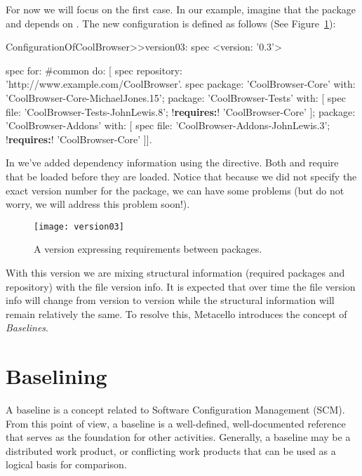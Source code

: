 \documentclass[a4paper,10pt,twoside]{book}
\begin{document}
For now we will focus on the first case. In our example, imagine that the package  and  depends on . The new configuration  is defined as follows (See Figure~\ref{fig:version03}):

\begin{code}{}
ConfigurationOfCoolBrowser>>version03: spec 
	<version: '0.3'>
	
	spec for: #common do: [
		spec repository: 'http://www.example.com/CoolBrowser'.
		spec 
			package: 'CoolBrowser-Core' with: 'CoolBrowser-Core-MichaelJones.15';
			package: 'CoolBrowser-Tests' with: [
				spec 
					file: 'CoolBrowser-Tests-JohnLewis.8';
					!\textbf{requires:}! 'CoolBrowser-Core' ];
			package: 'CoolBrowser-Addons' with: [
				spec 
					file: 'CoolBrowser-Addons-JohnLewis.3';
					!\textbf{requires:}! 'CoolBrowser-Core' ]].
\end{code}

In  we've added dependency information using the  directive.
Both  and   require that  be loaded before they are loaded. Notice that because we did not specify the exact version number for the  package, we can have some problems (but do not worry, we will address this problem soon!).

\begin{figure}
\begin{center}
\texttt{[image: version03]}
\caption{A version expressing requirements between packages.\label{fig:version03}}
\end{center}
\end{figure} 


With this version we are mixing structural information (required packages and repository) with the file version info. It is expected that over time the file version info will change from
version to version while the structural information will remain relatively the same. To resolve this, Metacello introduces the concept of {\em Baselines}.


\section{Baselining}
A baseline is a concept related to Software Configuration Management (SCM). From this point of view, a baseline is a well-defined, well-documented reference that serves as the foundation for other activities. Generally, a baseline may be a distributed work product, or conflicting work products that can be used as a logical basis for comparison. 
\end{document}
